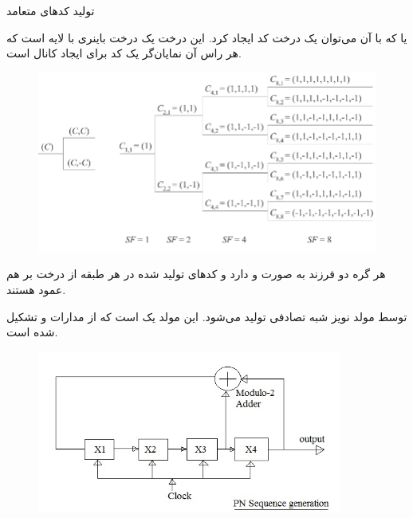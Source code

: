 \SubProblem
{تولید کدهای متعامد}
{
یا
که با آن می‌توان یک درخت کد ایجاد کرد. این درخت یک درخت باینری با
لایه است که هر راس آن نمایان‌گر یک کد برای ایجاد کانال است.

\begin{figure}[H]
    \includegraphics[width=15cm]{Images/OSVF.png}
    \centering
    \caption{}
\end{figure}

هر گره دو فرزند به صورت
و
دارد و کدهای تولید شده در هر طبقه از درخت بر هم عمود هستند.


\newpage
{}
توسط مولد نویز شبه تصادفی تولید می‌شود.
این مولد یک
است که از مدارات
و
تشکیل شده است.

\begin{figure}[H]
    \includegraphics[width=10cm]{Images/PN.jpg}
    \centering
    \caption{}
\end{figure}


}

